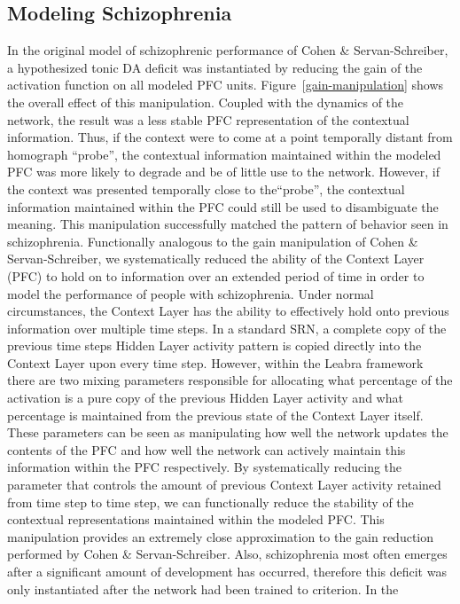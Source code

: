 \documentclass[man]{apa}
\begin{document}
\subsection{Modeling Schizophrenia}
In the original model of schizophrenic performance of Cohen \& Servan-Schreiber, a hypothesized tonic DA deficit was instantiated by reducing the gain of the activation function on all modeled PFC units. Figure~\ref{gain-manipulation} shows the overall effect of this manipulation.  Coupled with the dynamics of the network, the result was a less stable PFC representation of the contextual information.  Thus, if the context were to come at a point temporally distant from homograph ``probe'', the contextual information maintained within the modeled PFC was more likely to degrade and be of little use to the network.  However, if the context was presented temporally close to the``probe'', the contextual information maintained within the PFC could still be used to disambiguate the meaning.  This manipulation successfully matched the pattern of behavior seen in schizophrenia.  Functionally analogous to the gain manipulation of Cohen \& Servan-Schreiber, we systematically reduced the ability of the Context Layer (PFC) to hold on to information over an extended period of time in order to model the performance of people with schizophrenia.  Under normal circumstances, the Context Layer has the ability to effectively hold onto previous information over multiple time steps.  In a standard SRN, a complete copy of the previous time steps Hidden Layer activity pattern is copied directly into the Context Layer upon every time step.  However, within the Leabra framework there are two mixing parameters responsible for allocating what percentage of the activation is a pure copy of the previous Hidden Layer activity and what percentage is maintained from the previous state of the Context Layer itself.  These parameters can be seen as manipulating how well the network updates the contents of the PFC and how well the network can actively maintain this information within the PFC respectively.  By systematically reducing the parameter that controls the amount of previous Context Layer activity retained from time step to time step, we can functionally reduce the stability of the contextual representations maintained within the modeled PFC.  This manipulation provides an extremely close approximation to the gain reduction performed by Cohen \& Servan-Schreiber.   Also, schizophrenia most often emerges after a significant amount of development has occurred, therefore this deficit was only instantiated after the network had been trained to criterion.  In the 
\end{document}
